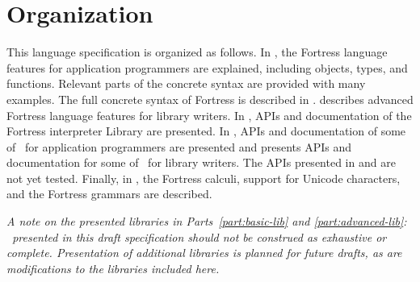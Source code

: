 %
%
%
%

\section{Organization}

This language specification is organized as follows.
In , the Fortress language features for
application programmers are explained, including objects, types, and
functions. Relevant parts of the concrete syntax are provided
with many examples.  The full concrete syntax of Fortress is described in
.
 describes advanced Fortress language
features for library writers.
In , APIs and documentation of the Fortress interpreter Library
are presented.
In , APIs and documentation of some of
\library\ for application programmers are presented
and  presents
APIs and documentation for some of \library\ for library writers.
The APIs presented in  and 
are not yet tested.
Finally, in , the Fortress calculi,
support for Unicode characters, and the Fortress grammars are described.

\emph{A note on the presented libraries in
  Parts~\ref{part:basic-lib} and \ref{part:advanced-lib}:
  \Library\ presented in this draft specification
  should not be construed as exhaustive or complete.
  Presentation of additional libraries is planned for future drafts,
  as are modifications to the libraries included here.}

